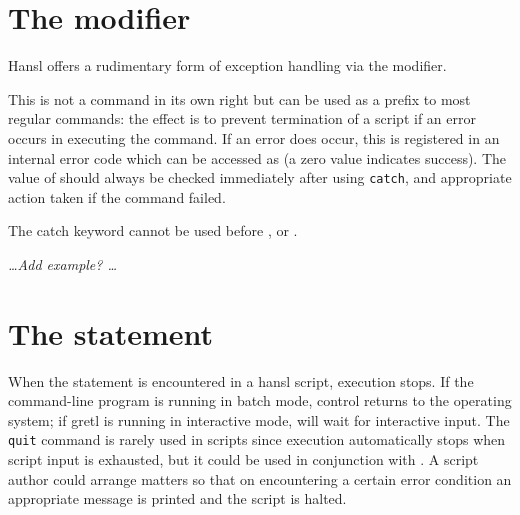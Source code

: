 \section{The  modifier}

Hansl offers a rudimentary form of exception handling via the
 modifier.

This is not a command in its own right but can be used as a prefix to
most regular commands: the effect is to prevent termination of a
script if an error occurs in executing the command. If an error does
occur, this is registered in an internal error code which can be
accessed as  (a zero value indicates success). The value
of  should always be checked immediately after using
\texttt{catch}, and appropriate action taken if the command failed.

The catch keyword cannot be used before ,  or
.

\emph{\ldots Add example? \ldots}

\section{The  statement}

When the  statement is encountered in a hansl script,
execution stops. If the command-line program  is running
in batch mode, control returns to the operating system; if gretl is
running in interactive mode,  will wait for interactive
input. The \texttt{quit} command is rarely used in scripts since
execution automatically stops when script input is exhausted, but it
could be used in conjunction with . A script author could
arrange matters so that on encountering a certain error condition an
appropriate message is printed and the script is halted.

